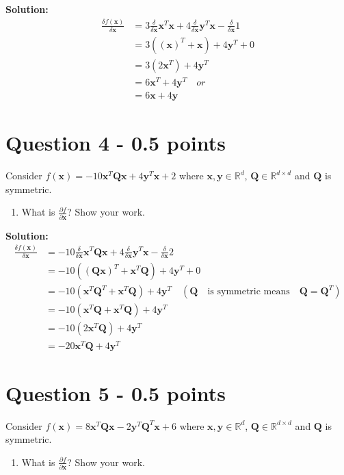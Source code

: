 \documentclass[11pt]{article}
\begin{document}
\textbf{Solution:}
\begin{align*}
\frac{\delta f(\mathbf{x})}{\delta \mathbf{x}} &= 3\frac{\delta}{\delta \mathbf{x}} \mathbf{x}^T\mathbf{x}  + 4 \frac{\delta}{\delta \mathbf{x}} \mathbf{y}^T\mathbf{x} - \frac{\delta}{\delta \mathbf{x}} 1\\
&= 3((\mathbf{x})^T + \mathbf{x})  + 4 \mathbf{y}^T + 0\\
&= 3(2\mathbf{x}^T)  + 4 \mathbf{y}^T\\
&= 6\mathbf{x}^T  + 4 \mathbf{y}^T \quad or\\
&=6\mathbf{x}  + 4 \mathbf{y}
\end{align*}

\section*{Question 4 - 0.5 points}
Consider $f(\mathbf{x}) = -10\mathbf{x}^T\mathbf{Q}\mathbf{x} + 4\mathbf{y}^T\mathbf{x} + 2$ where $\mathbf{x}, \mathbf{y} \in \mathbb{R}^d$, $\mathbf{Q} \in \mathbb{R}^{d\times d}$ and $\mathbf{Q}$ is symmetric.
 \begin{enumerate} 
\item What is $\frac{\partial f}{\partial\mathbf{x}}$?  Show your work. 
\end{enumerate}

\textbf{Solution:}
\begin{align*}
\frac{\delta f(\mathbf{x})}{\delta \mathbf{x}} &= -10\frac{\delta}{\delta \mathbf{x}} \mathbf{x}^T\mathbf{Q}\mathbf{x}  + 4 \frac{\delta}{\delta \mathbf{x}} \mathbf{y}^T\mathbf{x} - \frac{\delta}{\delta \mathbf{x}} 2 \\
&= -10((\mathbf{Q}\mathbf{x})^T + \mathbf{x}^T\mathbf{Q})  + 4 \mathbf{y}^T + 0 \\
&= -10(\mathbf{x}^T\mathbf{Q}^T + \mathbf{x}^T\mathbf{Q})  + 4 \mathbf{y}^T \quad (\mathbf{Q}\quad\textrm{is symmetric means} \quad \mathbf{Q} = \mathbf{Q}^T )\\
&= -10(\mathbf{x}^T\mathbf{Q} + \mathbf{x}^T\mathbf{Q})  + 4 \mathbf{y}^T\\
&= -10(2\mathbf{x}^T\mathbf{Q})  + 4 \mathbf{y}^T\\
&= -20\mathbf{x}^T\mathbf{Q}  + 4 \mathbf{y}^T
\end{align*}

\section*{Question 5 - 0.5 points}
Consider $f(\mathbf{x}) = 8\mathbf{x}^T\mathbf{Q}\mathbf{x} - 2\mathbf{y}^T\mathbf{Q}^T\mathbf{x} + 6$ where $\mathbf{x}, \mathbf{y} \in \mathbb{R}^d$, $\mathbf{Q} \in \mathbb{R}^{d\times d}$ and $\mathbf{Q}$ is symmetric.
\begin{enumerate} 
\item What is $\frac{\partial f}{\partial\mathbf{x}}$?  Show your work.
\end{enumerate}
\end{document}
